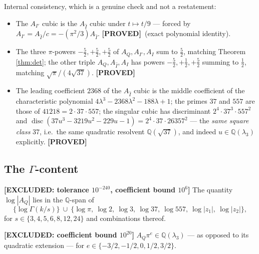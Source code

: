 \documentclass[11pt,reqno]{amsart}
\theoremstyle{plain}
\theoremstyle{definition}
\theoremstyle{remark}
\newcommand{\PROVED}{{\normalfont\sffamily\bfseries[PROVED]}}
\newcommand{\EXCL}[1]{{\normalfont\sffamily\bfseries[EXCLUDED: #1]}}
\newcommand{\QQ}{\mathbb{Q}}
\DeclareMathOperator{\Disc}{disc}
\newcommand{\Ihat}{\widehat{I}}
\begin{document}
Internal consistency, which is a genuine check and not a restatement:
\begin{itemize}[leftmargin=1.6em]
\item The $A_{I'}$ cubic is the $A_{\Ihat}$ cubic under $t\mapsto t/9$ --- forced by
$A_{I'}=A_{\Ihat}/c=-(\pi^2/3)A_{\Ihat}$. \PROVED\ (exact polynomial identity).
\item The three $\pi$-powers $-\tfrac52,+\tfrac52,+\tfrac52$ of $A_Q,A_{I'},A_I$ sum to
$\tfrac52$, matching Theorem \ref{thm:det}; the other triple $A_Q,A_{\Ihat},A_I$ has powers
$-\tfrac52,+\tfrac12,+\tfrac52$ summing to $\tfrac12$, matching $\sqrt\pi/(4\sqrt{37})$.
\PROVED
\item The leading coefficient $2368$ of the $A_{\Ihat}$ cubic is the middle coefficient of the
characteristic polynomial $4\lambda^3-2368\lambda^2-188\lambda+1$; the primes $37$ and $557$ are
those of $41218=2\cdot37\cdot557$; the singular cubic has discriminant $2^4\cdot37^3\cdot557^2$
and $\Disc(37u^3-3219u^2-229u-1)=2^4\cdot37\cdot26357^2$ --- the \emph{same square class} $37$,
i.e.\ the same quadratic resolvent $\QQ(\sqrt{37})$, and indeed $u\in\QQ(\lambda_3)$ explicitly.
\PROVED
\end{itemize}

\subsection{The $\Gamma$-content}
\EXCL{tolerance $10^{-240}$, coefficient bound $10^{6}$} The quantity $\log|A_Q|$ lies in the
$\QQ$-span of
\[
  \{\log\Gamma(k/s)\}\ \cup\
  \{\log\pi,\ \log2,\ \log3,\ \log37,\ \log557,\ \log|z_1|,\ \log|z_2|\},
\]
for $s\in\{3,4,5,6,8,12,24\}$ and combinations thereof.

\EXCL{coefficient bound $10^{20}$} $A_Q\pi^{e}\in\QQ(\lambda_3)$ --- as opposed to its quadratic
extension --- for $e\in\{-3/2,-1/2,0,1/2,3/2\}$.
\end{document}
